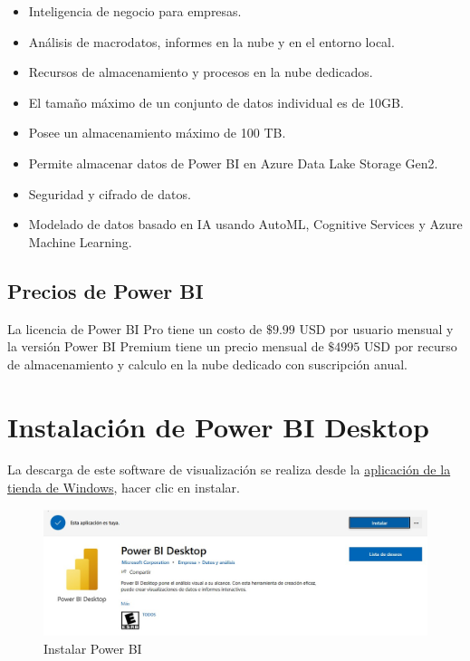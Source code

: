 \documentclass[
]{book}
\providecommand{\tightlist}{%
  \setlength{\itemsep}{0pt}\setlength{\parskip}{0pt}}
\begin{document}
\begin{itemize}
  \begin{itemize}
  \tightlist
  \item
    Inteligencia de negocio para empresas.
  \item
    Análisis de macrodatos, informes en la nube y en el entorno local.
  \item
    Recursos de almacenamiento y procesos en la nube dedicados.
  \item
    El tamaño máximo de un conjunto de datos individual es de 10GB.
  \item
    Posee un almacenamiento máximo de 100 TB.
  \item
    Permite almacenar datos de Power BI en Azure Data Lake Storage Gen2.
  \item
    Seguridad y cifrado de datos.
  \item
    Modelado de datos basado en IA usando AutoML, Cognitive Services y Azure Machine Learning.
  \end{itemize}
\end{itemize}

\hypertarget{precios-de-power-bi}{%
\subsection{Precios de Power BI}\label{precios-de-power-bi}}

La licencia de Power BI Pro tiene un costo de \(\$9.99\) USD por usuario mensual y la versión Power BI Premium tiene un precio mensual de \(\$4995\) USD por recurso de almacenamiento y calculo en la nube dedicado con suscripción anual.

\hypertarget{instalaciuxf3n-de-power-bi-desktop}{%
\section{Instalación de Power BI Desktop}\label{instalaciuxf3n-de-power-bi-desktop}}

La descarga de este software de visualización se realiza desde la \href{https://aka.ms/pbidesktopstore}{aplicación de la tienda de Windows}, hacer clic en instalar.

\begin{figure}

{\centering \includegraphics[width=0.6\linewidth]{Imágenes/powerbi4} 

}

\caption{Instalar Power BI}\label{fig:instalacionpowerbi-fig}
\end{figure}
\end{document}
